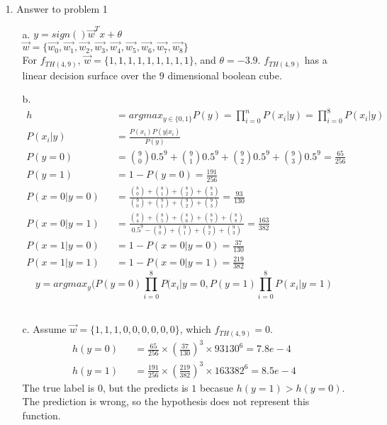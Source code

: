 \begin{enumerate}
\item[1.] Answer to problem 1
	\begin{enumerate}
	\item[a.] $y = sign()\vec{w}^Tx + \theta$ \\
		$\vec{w} = \{\vec{w_0}, \vec{w_1}, \vec{w_2}, \vec{w_3}, \vec{w_4}, \vec{w_5}, \vec{w_6}, \vec{w_7}, \vec{w_8}\}$ \\
		For $f_{TH(4,9)}$, $\vec{w} = \{1,1,1,1,1,1,1,1,1\}$, and $\theta = -3.9$. $f_{TH(4,9)}$ has a linear decision surface over the $9$ dimensional boolean cube.\\
	\item[b.] 
		\begin{eqnarray}
			h && = argmax_{y \in \{0,1\}} P(y) = \prod_{i=0}^{n} P(x_i|y) = \prod_{i=0}^{8} P(x_i|y) \\
			P(x_i|y) && = \frac{P(x_i)P(y|x_i)}{P(y)} \\
			P(y=0) && = \binom{9}{0}0.5^9 + \binom{9}{1}0.5^9 + \binom{9}{2}0.5^9 + \binom{9}{3}0.5^9 = \frac{65}{256} \\
			P(y=1) && = 1 - P(y=0) = \frac{191}{256}\\
			P(x=0|y=0) && = \frac{\binom{8}{0} + \binom{8}{1} + \binom{8}{2} + \binom{8}{3}}{\binom{9}{0} + \binom{9}{1} + \binom{9}{2} + \binom{9}{3}} = \frac{93}{130} \\
			P(x=0|y=1) && = \frac{\binom{8}{4} + \binom{8}{5} + \binom{8}{6} + \binom{8}{7} + \binom{8}{8}}{0.5^9 - \binom{9}{0} + \binom{9}{1} + \binom{9}{2} + \binom{9}{3}} = \frac{163}{382} \\
			P(x=1|y=0) && = 1 - P(x=0|y=0) = \frac{37}{130}\\
			P(x=1|y=1) && = 1 - P(x=0|y=1) = \frac{219}{382}
		\end{eqnarray}
			\[ y = argmax_y( P(y=0) \prod_{i=0}^{8} P(x_i|y=0, P(y=1) \prod_{i=0}^{8} P(x_i|y=1) \]
			\\
	\item[c.] Assume $\vec{w} = \{1,1,1,0,0,0,0,0,0\}$, which $f_{TH(4,9)} = 0$.
		\begin{eqnarray}
			h(y=0) && = \frac{65}{256} \times (\frac{37}{130})^3 \times{93}{130}^6 = 7.8e-4 \\
			h(y=1) && = \frac{191}{256} \times (\frac{219}{382})^3 \times{163}{382}^6 = 8.5e-4
		\end{eqnarray}
		The true label is $0$, but the predicts is $1$ becasue $h(y=1) > h(y=0)$. The prediction is wrong, so the hypothesis does not represent this function.\\

\end{enumerate}
\end{enumerate}
